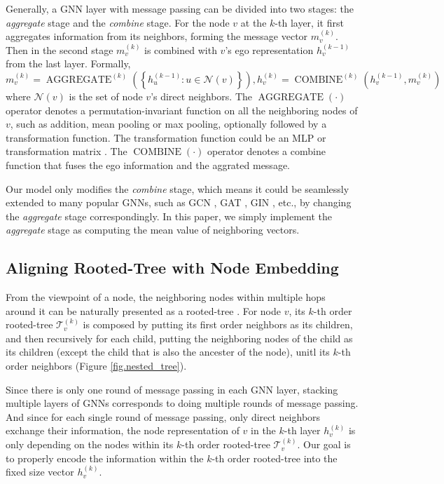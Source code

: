 \documentclass{article}
\begin{document}
Generally, a GNN layer with message passing can be divided into two stages: the \textit{aggregate} stage and the \textit{combine} stage. For the node $v$ at the $k$-th layer, it first aggregates information from its neighbors, forming the message vector $m_{v}^{(k)}$. Then in the second stage $m_{v}^{(k)}$ is combined with $v$'s ego representation $h_{v}^{(k-1)}$ from the last layer. Formally,
\begin{equation}
m_{v}^{(k)}=\operatorname{AGGREGATE}^{(k)}\left(\left\{h_{u}^{(k-1)}: u \in \mathcal{N}(v)\right\}\right), h_{v}^{(k)}=\operatorname{COMBINE}^{(k)}\left(h_{v}^{(k-1)}, m_{v}^{(k)}\right)
\end{equation}
where $\mathcal{N}(v)$ is the set of node $v$'s direct neighbors. The $\operatorname{AGGREGATE}(\cdot)$ operator denotes a permutation-invariant function on all the neighboring nodes of $v$, such as addition, mean pooling or max pooling, optionally followed by a transformation function. The transformation function could be an MLP \citep{xu2018powerful} or transformation matrix \citep{kipf2016semi}. The $\operatorname{COMBINE}(\cdot)$ operator denotes a combine function that fuses the ego information and the aggrated message. 

Our model only modifies the \textit{combine} stage, which means it could be seamlessly extended to many popular GNNs, such as GCN \citep{kipf2016semi}, GAT \citep{velivckovic2017graph}, GIN \citep{xu2018powerful}, etc., by changing the \textit{aggregate} stage correspondingly. In this paper, we simply implement the \textit{aggregate} stage as computing the mean value of neighboring vectors.


\subsection{Aligning Rooted-Tree with Node Embedding}
\label{align_rooted_tree}
From the viewpoint of a node, the neighboring nodes within multiple hops around it can be naturally presented as a rooted-tree \citep{xu2018powerful,xu2018representation,liu2020towards}. For node $v$, its $k$-th order rooted-tree $\mathcal{T}_{v}^{(k)}$ is composed by putting its first order neighbors as its children, and then recursively for each child, putting the neighboring nodes of the child as its children (except the child that is also the ancester of the node), unitl its $k$-th order neighbors (Figure \ref{fig.nested_tree}). 

Since there is only one round of message passing in each GNN layer, stacking multiple layers of GNNs corresponds to doing multiple rounds of message passing. And since for each single round of message passing, only direct neighbors exchange their information, the node representation of $v$ in the $k$-th layer $h_v^{(k)}$ is only depending on the nodes within its $k$-th order rooted-tree $\mathcal{T}_{v}^{(k)}$. Our goal is to properly encode the information within the $k$-th order rooted-tree into the fixed size vector $h_v^{(k)}$. 
\end{document}
